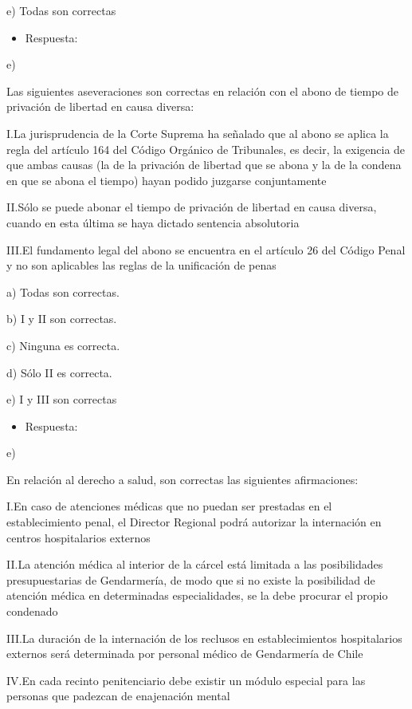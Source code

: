 \documentclass[letterpaper, 11pt]{article}
\begin{document}
e) Todas son correctas

\begin{itemize}
\item Respuesta:
\end{itemize}
e)

Las siguientes aseveraciones son correctas en relación con el abono de tiempo
de privación de libertad en causa diversa:

I.La jurisprudencia de la Corte Suprema ha señalado que al abono se aplica la regla
del artículo 164 del Código Orgánico de Tribunales, es decir, la exigencia de que
ambas causas (la de la privación de libertad que se abona y la de la condena en que
se abona el tiempo) hayan podido juzgarse conjuntamente

II.Sólo se puede abonar el tiempo de privación de libertad en causa diversa, cuando
en esta última se haya dictado sentencia absolutoria

III.El fundamento legal del abono se encuentra en el artículo 26 del Código Penal y no
son aplicables las reglas de la unificación de penas

a) Todas son correctas.

b) I y II son correctas.

c) Ninguna es correcta.

d) Sólo II es correcta.

e) I y III son correctas

\begin{itemize}
\item Respuesta:
\end{itemize}
e)


En relación al derecho a salud, son correctas las siguientes afirmaciones:

I.En caso de atenciones médicas que no puedan ser prestadas en el establecimiento
penal, el Director Regional podrá autorizar la internación en centros hospitalarios
externos

II.La atención médica al interior de la cárcel está limitada a las posibilidades
presupuestarias de Gendarmería, de modo que si no existe la posibilidad de
atención médica en determinadas especialidades, se la debe procurar el propio
condenado

III.La duración de la internación de los reclusos en establecimientos hospitalarios
externos será determinada por personal médico de Gendarmería de Chile

IV.En cada recinto penitenciario debe existir un módulo especial para las personas
que padezcan de enajenación mental
\end{document}
